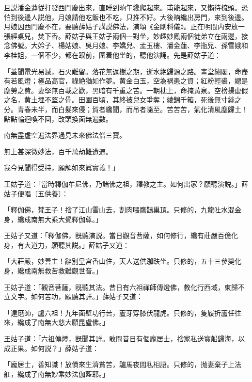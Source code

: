 且説潘金蓮従打發西門慶出來，直睡到晌午纔爬起來。甫能起來，又懶待梳頭。恐怕到後邊人説他，月娘請他吃飯也不吃，只推不好。大後晌纔出房門，來到後邊。月娘因西門慶不在，要聽薛姑子講説佛法，演頌《金剛科儀》。正在明間内安放一張經桌兒，焚下香。薛姑子與王姑子兩個一對坐，妙趣妙鳳兩個徒弟立在兩邊，接念佛號。大妗子、楊姑娘、吳月娘、李嬌兒、孟玉樓、潘金蓮、李瓶兒、孫雪娥和李桂姐，一個不少，都在跟前，圍着他坐的，聽他演誦。先是薛姑子道：

\begin{myquote}
「蓋聞電光易滅，石火難留。落花無返樹之期，逝水絶歸源之路。畫堂繡閣，命盡有若風燈；極品高官，祿絶猶如作夢。黄金白玉，空為祸患之資；紅粉輕裘，總是塵勞之費。妻孥無百載之歡，黑暗有千重之苦。一朝枕上，命掩黃泉。空榜揚虚假之名，黄土埋不堅之骨。田園百頃，其終被兒女爭奪；綾錦千箱，死後無寸絲之分。青春未半，而白髮來侵；賀者纔聞，而吊者隨至。苦苦苦，氣化清風塵歸土！點點輪迴喚不回，改頭換面無遍數。

南無盡虚空遍法界過見未來佛法僧三寳。

無上甚深微妙法，百千萬劫難遭遇。

我今見聞得受持，願解如來眞實義！」
\end{myquote}

王姑子道：「當時釋伽牟尼佛，乃諸佛之祖，釋教之主。如何出家？願聽演説。」薛姑子便唱〔五供養〕：

\begin{myquote}
「釋伽佛，梵王子！捨了江山雪山去，割肉喂鷹鵲巢頂。只修的，九龍吐水混金身，纔成南無大乘大覺釋伽尊。」
\end{myquote}

王姑子又道：「釋伽佛，旣聽演説。當日觀音菩薩，如何修行，纔有莊嚴百億化身，有大道力，願聽其説。」薛姑子又道：

\begin{myquote}
「大莊嚴，妙善主！辭別皇宫香山住，天人送供跏趺坐。只修的，五十三參變化身，纔成南無救苦救難觀世音。」
\end{myquote}

王姑子道：「觀音菩薩，旣聽其法。昔日有六祖禪師傳燈佛，教化行西域，東歸不立文字。如何苦功，願聽其詳。」薛姑子又道：

\begin{myquote}
「達磨師，盧六祖！九年面壁功行苦，蘆芽穿膝伏龍虎。只修的，隻履折蘆任往來，纔成了南無大慈大願昆盧佛。」
\end{myquote}

王姑子道：「六祖傳燈，旣聞其詳。敢問昔日有個龐居士，捨家私送寳船歸海，以成正果。如何説？」薛姑子道：

\begin{myquote}
「龐居士，善知識！放債來生濟貧苦，驢馬夜間私相語。只修的，抛妻棄子上法舡，纔成了南無妙乘妙法伽藍耶。」
\end{myquote}

